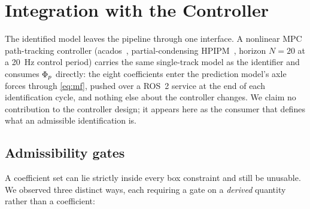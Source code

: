 \section{Integration with the Controller}
\label{sec:integration}

The identified model leaves the pipeline through one interface. A nonlinear MPC
path-tracking controller (acados~\cite{acados2022}, partial-condensing
HPIPM~\cite{hpipm2020}, horizon $N=20$ at a \SI{20}{\hertz} control period)
carries the same single-track model as the identifier and consumes $\Phi_{p}$
directly: the eight coefficients enter the prediction model's axle forces
through \eqref{eq:mf}, pushed over a ROS~2 service at the end of each
identification cycle, and nothing else about the controller changes. We claim
no contribution to the controller design; it appears here as the consumer that
defines what an admissible identification is.

\subsection{Admissibility gates}
\label{subsec:gates}

A coefficient set can lie strictly inside every box constraint and still be
unusable. We observed three distinct ways, each requiring a gate on a
\emph{derived} quantity rather than a coefficient:

